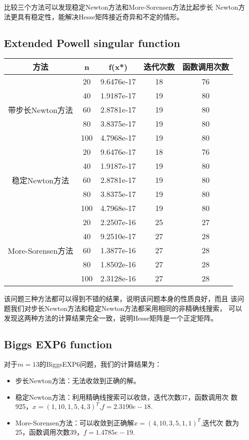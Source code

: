 \documentclass[a4paper,  11pt]{ctexart}
\begin{document}
比较三个方法可以发现稳定Newton方法和More-Sorensen方法比起步长
Newton方法更具有稳定性，能解决Hesse矩阵接近奇异和不定的情形。
\subsection{Extended Powell singular function}
\begin{table}[H]
  \centering
  \begin{tabular}{|c|c|c|c|c|}
    \hline
  方法 &  n & f(x*) & 迭代次数 & 函数调用次数  \\
  \hline 
  \multirow{5}{*}{带步长Newton方法} 
  & 20 & 9.6476e-17 & 18 & 76 \\
  \cline{2-5}
  & 40& 1.9187e-17 & 19 & 80 \\
  \cline{2-5}
  & 60 & 2.8781e-17 & 19 & 80 \\
  \cline{2-5}
  & 80 & 3.8375e-17 & 19 & 80 \\
  \cline{2-5}
  & 100 & 4.7968e-17 & 19 & 80 \\
  \hline
  \multirow{5}{*}{稳定Newton方法} 
  & 20 & 9.6476e-17 & 18 & 76 \\
  \cline{2-5}
  & 40& 1.9187e-17 & 19 & 80 \\
  \cline{2-5}
  & 60 & 2.8781e-17 & 19 & 80 \\
  \cline{2-5}
  & 80 & 3.8375e-17 & 19 & 80 \\
  \cline{2-5}
  & 100 & 4.7968e-17 & 19 & 80 \\
  \hline
  \multirow{5}{*}{More-Sorensen方法} 
  & 20 & 2.2507e-16 & 25 & 27 \\
  \cline{2-5}
  & 40& 9.2510e-17 & 27 & 28 \\
  \cline{2-5}
  & 60 & 1.3877e-16 & 27 & 28 \\
  \cline{2-5}
  & 80 & 1.8502e-16 & 27 & 28 \\
  \cline{2-5}
  & 100 & 2.3128e-16 & 27 & 28 \\
  \hline
  
  \end{tabular}
\end{table}
该问题三种方法都可以得到不错的结果，说明该问题本身的性质良好，而且
该问题我们对步长Newton方法和稳定Newton方法都采用相同的非精确线搜索，
可以发现这两种方法的计算结果完全一致，说明Hesse矩阵是一个正定矩阵。
\subsection{Biggs EXP6 function}
对于$m=13$的BiggsEXP6问题，我们的计算结果为：
\begin{itemize}
  \item 步长Newton方法：无法收敛到正确的解。
  \item 稳定Newton方法：利用精确线搜索可以收敛，迭代次数37，函数调用次
    数925，$x=(1,10,1,5,4,3)^T$,$f=2.3190e-18$.
  \item More-Sorensen方法：可以收敛到正确解$x=(4,10,3,5,1,1)^T$,迭代次
    数为25，函数调用次数39，$f=1.4785e-19$.
\end{itemize}
\end{document}
